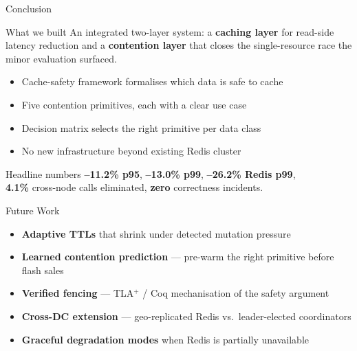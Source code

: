 \documentclass[aspectratio=169, 11pt]{beamer}
\begin{document}
\begin{frame}{Conclusion}
\begin{block}{What we built}
An integrated two-layer system: a \textbf{caching layer} for read-side latency reduction and a \textbf{contention layer} that closes the single-resource race the minor evaluation surfaced.
\end{block}
\begin{itemize}
    \item Cache-safety framework formalises which data is safe to cache
    \item Five contention primitives, each with a clear use case
    \item Decision matrix selects the right primitive per data class
    \item No new infrastructure beyond existing Redis cluster
\end{itemize}
\begin{exampleblock}{Headline numbers}
\centering
\textbf{--11.2\% p95}, \textbf{--13.0\% p99}, \textbf{--26.2\% Redis p99}, \\
\textbf{4.1\%} cross-node calls eliminated, \textbf{zero} correctness incidents.
\end{exampleblock}
\end{frame}

\begin{frame}{Future Work}
\begin{itemize}
    \item \textbf{Adaptive TTLs} that shrink under detected mutation pressure
    \item \textbf{Learned contention prediction} --- pre-warm the right primitive before flash sales
    \item \textbf{Verified fencing} --- TLA$^+$ / Coq mechanisation of the safety argument
    \item \textbf{Cross-DC extension} --- geo-replicated Redis vs.\ leader-elected coordinators
    \item \textbf{Graceful degradation modes} when Redis is partially unavailable
\end{itemize}
\end{frame}
\end{document}
